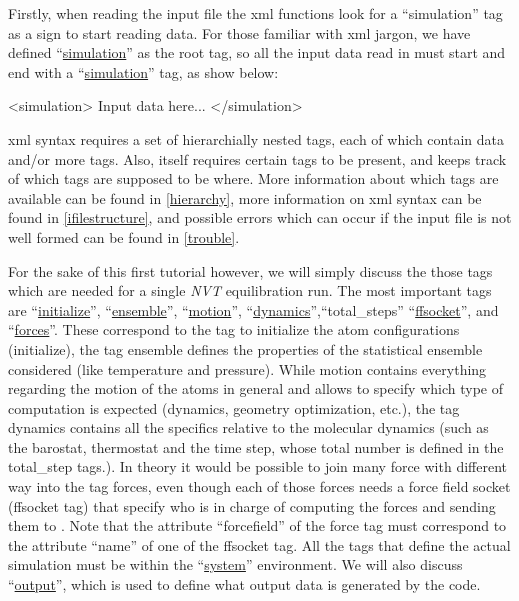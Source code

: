 \documentclass[11pt,english,fleqn]{report}
\newenvironment{code}{%
\footnotesize 
\verbatim
}{
\endverbatim
\normalsize
}
\begin{document}
Firstly, when reading the input file the \ipi xml functions look
for a {}``simulation''
tag as a sign to start reading data. For those familiar with xml jargon,
we have defined {}``\hyperref[SIMULATION]{simulation}'' as the 
root tag, so all the input data read in must start and end with a 
{}``\hyperref[SIMULATION]{simulation}'' tag, as show below:

\begin{code}
<simulation>
   Input data here...
</simulation>
\end{code}

xml syntax requires a set of hierarchially nested tags, each of which
contain data and/or more tags. Also, \ipi itself requires certain
tags to be present, and keeps track of which tags are supposed to
be where. More information about which tags are available can be found
in \ref{hierarchy}, more information on xml syntax can be found in
\ref{ifilestructure}, and possible errors which can occur if the
input file is not well formed can be found in \ref{trouble}. 

For the sake of this first tutorial however, we will simply discuss the
those tags which are needed for a single \emph{NVT} equilibration run.
The most important tags are {}``\hyperref[INITIALIZER]{initialize}'', 
{}``\hyperref[ENSEMBLE]{ensemble}'', {}``\hyperref[MOTION]{motion}'', 
{}``\hyperref[DYNAMICS]{dynamics}'',{}``total\_steps''
{}``\hyperref[FFSOCKET]{ffsocket}'',
 and {}``\hyperref[FORCES]{forces}''.
These correspond to the tag to initialize the atom configurations (initialize),
the tag ensemble defines the properties of the statistical ensemble considered (like
temperature and pressure). While motion contains everything regarding
the motion of the atoms in general and allows to specify
which type of computation is expected (dynamics, geometry
optimization, etc.), the tag dynamics contains all the specifics
relative to the molecular dynamics (such as the barostat,
thermostat and the time step, whose total number is defined in
the total\_step tags.). In theory it would be possible to join many
force with different way into the tag forces, even though each of those
forces needs a force field socket (ffsocket tag) that specify who is
in charge of computing the forces and sending them to \ipi.  Note that
the attribute ``forcefield'' of the force tag must correspond to the
attribute ``name'' of one of the ffsocket tag. All the tags that
define the actual simulation must be within the {}``\hyperref[SYSTEM]{system}''
environment.
We will also discuss {}``\hyperref[OUTPUTS]{output}'', 
which is used to define what output data
is generated by the code.
\end{document}

